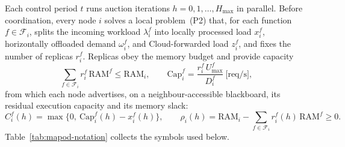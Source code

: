 Each control period $t$ runs auction iterations $h=0,1,\dots,H_{\max}$ in
parallel. Before coordination, every node $i$ solves a local problem~(P2)
that, for each function $f\in\mathcal{F}_i$, splits the incoming workload
$\lambda_i^f$ into locally processed load $x_i^f$, horizontally offloaded
demand $\omega_i^f$, and Cloud-forwarded load $z_i^f$, and fixes the number of
replicas $r_i^f$. Replicas obey the memory budget and provide capacity
\begin{equation}
  \sum_{f\in\mathcal{F}_i} r_i^f\,\mathrm{RAM}^f \le \mathrm{RAM}_i,
  \qquad
  \mathrm{Cap}_i^f = \frac{r_i^f\,U^f_{\max}}{D_i^f}\ \text{[req/s]} ,
  \tag{1,2}
\end{equation}
from which each node advertises, on a neighbour-accessible blackboard, its
residual execution capacity and its memory slack:
\begin{equation}
  C_i^f(h) = \max\!\big\{0,\ \mathrm{Cap}_i^f(h) - x_i^f(h)\big\},
  \qquad
  \rho_i(h) = \mathrm{RAM}_i - \sum_{f\in\mathcal{F}_i} r_i^f(h)\,\mathrm{RAM}^f \ge 0 .
  \tag{12,13}
\end{equation}
Table~\ref{tab:mapod-notation} collects the symbols used below.


